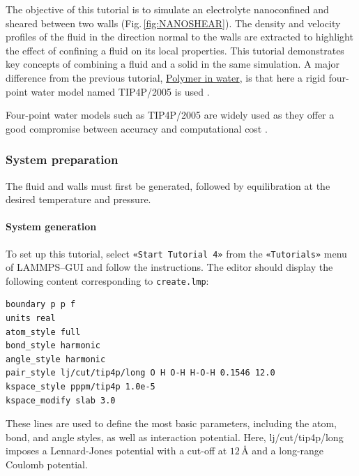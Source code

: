 \documentclass[9pt,tutorial]{livecoms}
\newcommand{\lmpcmd}[1]{\hspace{0pt}\colorbox{listing}{\textcolor{command}{\small{#1}}}\hspace{0pt}} %
\newcommand{\flecmd}[1]{\textcolor{command}{\texttt{#1}}} %
\newcommand{\guicmd}[1]{\textcolor{command}{\texttt{«#1»}}} %
\begin{document}
\noindent The objective of this tutorial is to simulate an electrolyte
nanoconfined and sheared between two walls (Fig.\,\ref{fig:NANOSHEAR}).  The density
and velocity profiles of the fluid in the direction normal to the walls are
extracted to highlight the effect of confining a fluid on its local properties.
This tutorial demonstrates key concepts of combining a fluid and a solid in
the same simulation.  A major difference from the previous tutorial,
\hyperref[all-atoms-label]{Polymer in water}, is that here a rigid four-point
water model named TIP4P/2005 is used \cite{abascal2005general}.

\begin{note}
Four-point water models such as TIP4P/2005 are widely used as they offer a
good compromise between accuracy and computational cost \cite{kadaoluwa2021systematic}.
\end{note}

\subsubsection{System preparation}

The fluid and walls must first be generated, followed by equilibration at the
desired temperature and pressure.

\paragraph{System generation}

To set up this tutorial, select \guicmd{Start Tutorial 4} from the
\guicmd{Tutorials} menu of LAMMPS--GUI and follow the instructions.
The editor should display the following content corresponding to \flecmd{create.lmp}:
\begin{lstlisting}
boundary p p f
units real
atom_style full
bond_style harmonic
angle_style harmonic
pair_style lj/cut/tip4p/long O H O-H H-O-H 0.1546 12.0
kspace_style pppm/tip4p 1.0e-5
kspace_modify slab 3.0
\end{lstlisting}
These lines are used to define the most basic parameters, including the
\lmpcmd{atom}, \lmpcmd{bond}, and \lmpcmd{angle} styles, as well as interaction
potential.  Here, \lmpcmd{lj/cut/tip4p/long} imposes a Lennard-Jones potential with
a cut-off at $12\,\text{$\text{\AA{}}$}$ and a long-range Coulomb potential.
\end{document}
